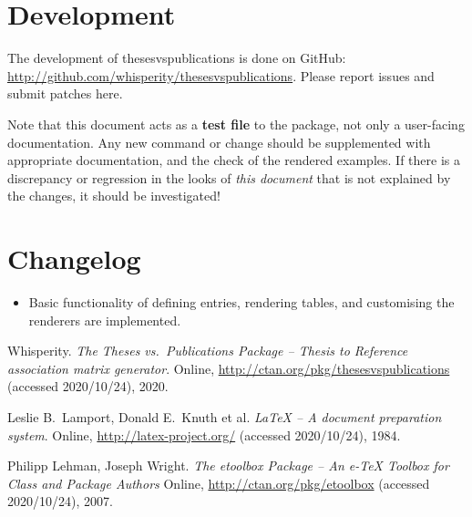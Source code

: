 \documentclass{article}
\begin{document}
\section{Development}
The development of \textsf{thesesvspublications} is done on GitHub: \url{http://github.com/whisperity/thesesvspublications}.
Please report issues and submit patches here.

Note that this document acts as a \textbf{test file} to the package, not only a user-facing documentation.
Any new command or change should be supplemented with appropriate documentation, and the check of the rendered examples.
If there is a discrepancy or regression in the looks of \emph{this document} that is not explained by the changes, it should be investigated!

\section{Changelog}\label{changelog}
\begin{itemize}
    \item Basic functionality of defining entries, rendering tables, and customising the renderers are implemented.
\end{itemize}


\begin{thebibliography}{3}
Whisperity. \textit{The \textsf{Theses vs.\ Publications} Package -- Thesis to Reference association matrix generator}.
Online, \url{http://ctan.org/pkg/thesesvspublications} (accessed 2020/10/24), 2020.

Leslie B.\ Lamport, Donald E.\ Knuth et al. 
\textit{\LaTeX{} -- A document preparation system}. 
Online, \url{http://latex-project.org/} (accessed 2020/10/24), 1984.

Philipp Lehman, Joseph Wright.
\textit{The \textsf{etoolbox} Package -- An e-\TeX{} Toolbox for Class and Package Authors}
Online, \url{http://ctan.org/pkg/etoolbox} (accessed 2020/10/24), 2007.
\end{thebibliography}
\end{document}
